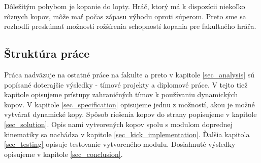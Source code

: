 Dôležitým pohybom je kopanie do lopty. Hráč, ktorý má k dispozícii niekoľko rôznych kopov, môže mať počas zápasu výhodu oproti súperom. Preto sme sa rozhodli preskúmať možnosti rožšírenia schopností kopania pre fakultného hráča.

\subsection{Štruktúra práce}
Práca nadväzuje na ostatné práce na fakulte a preto v kapitole \ref{sec_analysis} sú popísané doterajšie výsledky - tímové projekty a diplomové práce. V tejto tiež kapitole opisujeme prístupy zahraničných tímov k používaniu dynamických kopov. V kapitole \ref{sec_specification} opisujeme jednu z možností, akou je možné vytvárať dynamické kopy. Spôsob riešenia kopov do strany popisujeme v kapitole \ref{sec_solution}. Opis nami vytvorených kopov spolu s modulom doprednej kinematiky sa nachádza v kapitole \ref{sec_kick_implementation}. Ďalšia kapitola \ref{sec_testing} opisuje testovanie vytvoreného modulu. Dosiahnuté výsledky opisujeme v kapitole \ref{sec_conclusion}.
